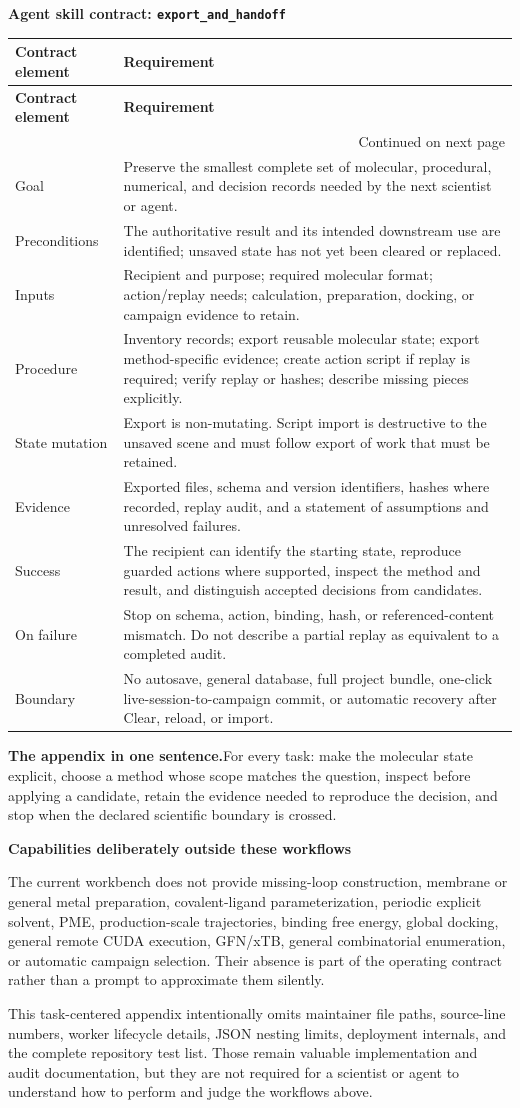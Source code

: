 \documentclass[10pt,letterpaper]{article}
\makeatletter
\newcommand{\code}[1]{\texttt{#1}}
\newcommand{\lead}[1]{\textbf{#1}\hspace{0.35em}}
\newcommand{\subhead}[1]{%
  \par\needspace{2\baselineskip}\vspace{2.5pt}%
  {\fontsize{10.91}{13.1}\selectfont\bfseries #1}\par\vspace{-1.5pt}}
\newenvironment{skillcontract}[1]{%
  \par\needspace{5\baselineskip}\vspace{2pt}%
  {\fontsize{10.91}{13.1}\selectfont\bfseries Agent skill contract: \code{#1}}\par\vspace{1pt}%
  \fontsize{8.4}{10}\selectfont
  \begin{longtable}{@{}K V@{}}
  \toprule
  \textbf{Contract element} & \textbf{Requirement}\\
  \midrule
  \endfirsthead
  \toprule
  \textbf{Contract element} & \textbf{Requirement}\\
  \midrule
  \endhead
  \midrule
  \multicolumn{2}{r}{\footnotesize Continued on next page}\\
  \endfoot
  \bottomrule
  \endlastfoot
}{%
  \end{longtable}
  \normalsize\fontsize{9.96}{11.95}\selectfont}
\newcommand{\contractrow}[2]{#1 & #2\\}
\makeatother
\begin{document}
\begin{skillcontract}{export\_and\_handoff}
\contractrow{Goal}{Preserve the smallest complete set of molecular, procedural, numerical, and decision records needed by the next scientist or agent.}
\contractrow{Preconditions}{The authoritative result and its intended downstream use are identified; unsaved state has not yet been cleared or replaced.}
\contractrow{Inputs}{Recipient and purpose; required molecular format; action/replay needs; calculation, preparation, docking, or campaign evidence to retain.}
\contractrow{Procedure}{Inventory records; export reusable molecular state; export method-specific evidence; create action script if replay is required; verify replay or hashes; describe missing pieces explicitly.}
\contractrow{State mutation}{Export is non-mutating. Script import is destructive to the unsaved scene and must follow export of work that must be retained.}
\contractrow{Evidence}{Exported files, schema and version identifiers, hashes where recorded, replay audit, and a statement of assumptions and unresolved failures.}
\contractrow{Success}{The recipient can identify the starting state, reproduce guarded actions where supported, inspect the method and result, and distinguish accepted decisions from candidates.}
\contractrow{On failure}{Stop on schema, action, binding, hash, or referenced-content mismatch. Do not describe a partial replay as equivalent to a completed audit.}
\contractrow{Boundary}{No autosave, general database, full project bundle, one-click live-session-to-campaign commit, or automatic recovery after Clear, reload, or import.}
\end{skillcontract}

\lead{The appendix in one sentence.}For every task: make the molecular state explicit, choose a method whose scope matches the question, inspect before applying a candidate, retain the evidence needed to reproduce the decision, and stop when the declared scientific boundary is crossed.

\subhead{Capabilities deliberately outside these workflows}

The current workbench does not provide missing-loop construction, membrane or general metal preparation, covalent-ligand parameterization, periodic explicit solvent, PME, production-scale trajectories, binding free energy, global docking, general remote CUDA execution, GFN/xTB, general combinatorial enumeration, or automatic campaign selection. Their absence is part of the operating contract rather than a prompt to approximate them silently.

{\fontsize{8.97}{10.8}\selectfont
This task-centered appendix intentionally omits maintainer file paths, source-line numbers, worker lifecycle details, JSON nesting limits, deployment internals, and the complete repository test list. Those remain valuable implementation and audit documentation, but they are not required for a scientist or agent to understand how to perform and judge the workflows above.\par}
\end{document}
